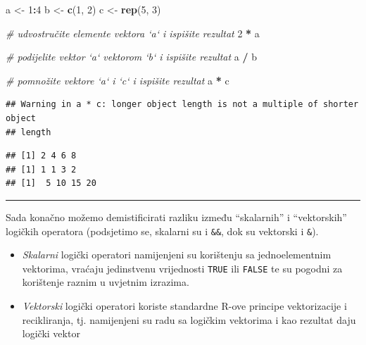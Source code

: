\documentclass[]{book}
\newenvironment{Shaded}{\begin{snugshade}}{\end{snugshade}}
\newcommand{\KeywordTok}[1]{\textcolor[rgb]{0.13,0.29,0.53}{\textbf{#1}}}
\newcommand{\DecValTok}[1]{\textcolor[rgb]{0.00,0.00,0.81}{#1}}
\newcommand{\StringTok}[1]{\textcolor[rgb]{0.31,0.60,0.02}{#1}}
\newcommand{\CommentTok}[1]{\textcolor[rgb]{0.56,0.35,0.01}{\textit{#1}}}
\newcommand{\OperatorTok}[1]{\textcolor[rgb]{0.81,0.36,0.00}{\textbf{#1}}}
\newcommand{\NormalTok}[1]{#1}
\theoremstyle{definition}
\theoremstyle{definition}
\theoremstyle{definition}
\theoremstyle{remark}
\begin{document}
\begin{Shaded}
\begin{Highlighting}[]
\NormalTok{a <-}\StringTok{ }\DecValTok{1}\OperatorTok{:}\DecValTok{4}
\NormalTok{b <-}\StringTok{ }\KeywordTok{c}\NormalTok{(}\DecValTok{1}\NormalTok{, }\DecValTok{2}\NormalTok{)}
\NormalTok{c <-}\StringTok{ }\KeywordTok{rep}\NormalTok{(}\DecValTok{5}\NormalTok{, }\DecValTok{3}\NormalTok{)}

\CommentTok{# udvostručite elemente vektora `a` i ispišite rezultat}
\DecValTok{2} \OperatorTok{*}\StringTok{ }\NormalTok{a}

\CommentTok{# podijelite vektor `a` vektorom `b` i ispišite rezultat}
\NormalTok{a }\OperatorTok{/}\StringTok{ }\NormalTok{b}

\CommentTok{# pomnožite vektore `a` i `c` i ispišite rezultat}
\NormalTok{a }\OperatorTok{*}\StringTok{ }\NormalTok{c}
\end{Highlighting}
\end{Shaded}

\begin{verbatim}
## Warning in a * c: longer object length is not a multiple of shorter object
## length
\end{verbatim}

\begin{verbatim}
## [1] 2 4 6 8
## [1] 1 1 3 2
## [1]  5 10 15 20
\end{verbatim}

\begin{center}\rule{0.5\linewidth}{\linethickness}\end{center}

Sada konačno možemo demistificirati razliku između ``skalarnih'' i
``vektorskih'' logičkih operatora (podsjetimo se, skalarni su
\texttt{\textbar{}\textbar{}} i \texttt{\&\&}, dok su vektorski
\texttt{\textbar{}} i \texttt{\&}).

\begin{itemize}
\item
  \emph{Skalarni} logički operatori namijenjeni su korištenju sa
  jednoelementnim vektorima, vraćaju jedinstvenu vrijednosti
  \texttt{TRUE} ili \texttt{FALSE} te su pogodni za korištenje raznim u
  uvjetnim izrazima.
\item
  \emph{Vektorski} logički operatori koriste standardne R-ove principe
  vektorizacije i recikliranja, tj. namijenjeni su radu sa logičkim
  vektorima i kao rezultat daju logički vektor
\end{itemize}
\end{document}
